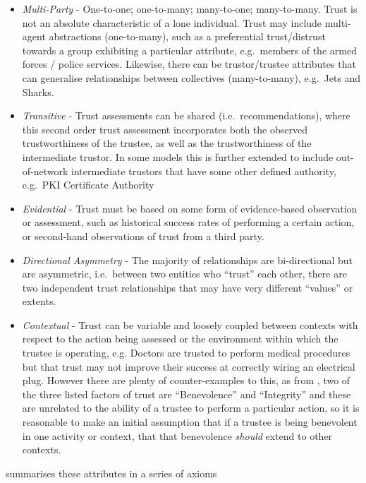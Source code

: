 \begin{itemize}
  \item \emph{Multi-Party} - One-to-one; one-to-many; many-to-one; many-to-many.
    Trust is not an absolute characteristic of a lone individual.
    Trust may include multi-agent abstractions (one-to-many), such as a preferential trust/distrust towards a group exhibiting a particular attribute, e.g.\ members of the armed forces / police services.
    Likewise, there can be trustor/trustee attributes that can generalise relationships between collectives (many-to-many), e.g.\ Jets and Sharks\cite{Robbins1961}.
  \item \emph{Transitive} - Trust assessments can be shared (i.e.\ recommendations), where this second order trust assessment incorporates both the observed trustworthiness of the trustee, as well as the trustworthiness of the intermediate trustor.
    In some models this is further extended to include out-of-network intermediate trustors that have some other defined authority, e.g.\ PKI Certificate Authority
  \item \emph{Evidential} - Trust must be based on some form of evidence-based observation or assessment, such as historical success rates of performing a certain action, or second-hand observations of trust from a third party.
  \item \emph{Directional Asymmetry} - The majority of relationships are bi-directional but are asymmetric, i.e.\ between two entities who ``trust'' each other, there are two independent trust relationships that may have very different ``values'' or extents.
  \item \emph{Contextual} - Trust can be variable and loosely coupled between contexts with respect to the action being assessed or the environment within which the trustee is operating, e.g.
    Doctors are trusted to perform medical procedures but that trust may not improve their success at correctly wiring an electrical plug.
    However there are plenty of counter-examples to this, as from \cite{Mayer1995}, two of the three listed factors of trust are ``Benevolence'' and ``Integrity'' and these are unrelated to the ability of a trustee to perform a particular action, so it is reasonable to make an initial assumption that if a trustee is being benevolent in one activity or context, that that benevolence \emph{should} extend to other contexts.
\end{itemize}

\cite{Liu2010} summarises these attributes in a series of axioms 

